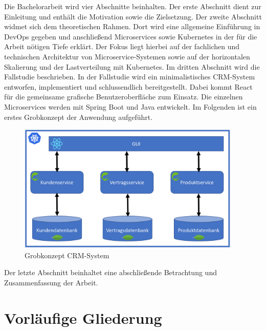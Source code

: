 \documentclass[
	a4paper,
	12pt,
	bibliography=numbered,
	listof=totoc,
	titlepage
]{scrartcl}
\begin{document}
Die Bachelorarbeit wird vier Abschnitte beinhalten.
Der erste Abschnitt dient zur Einleitung und enthält die Motivation sowie die Zielsetzung.
Der zweite Abschnitt widmet sich dem theoretischen Rahmen. Dort wird eine allgemeine Einführung in DevOps gegeben und anschließend Microservices sowie Kubernetes in der für die Arbeit nötigen Tiefe erklärt. Der Fokus liegt hierbei auf der fachlichen und technischen Architektur von Microservice-Systemen sowie auf der horizontalen Skalierung und der Lastverteilung mit Kubernetes.
Im dritten Abschnitt wird die Fallstudie beschrieben. In der Fallstudie wird ein minimalistisches CRM-System entworfen, implementiert und schlussendlich bereitgestellt. Dabei kommt React für die gemeinsame grafische Benutzeroberfläche zum Einsatz. Die einzelnen Microservices werden mit Spring Boot und Java entwickelt. Im Folgenden ist ein erstes Grobkonzept der Anwendung aufgeführt.
\begin{figure}[H] 
    \centering
    \includegraphics[width=0.95\textwidth]{figures/MicroCRM-Architecture.png}
    \caption{Grobkonzept CRM-System}
\end{figure}
Der letzte Abschnitt beinhaltet eine abschließende Betrachtung und Zusammenfassung der Arbeit.

\clearpage
\section{Vorläufige Gliederung}
\end{document}
